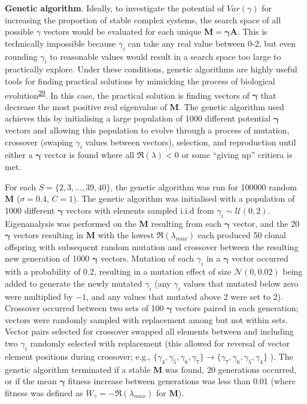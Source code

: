 \documentclass[]{article}
\begin{document}
\textbf{Genetic algorithm}. Ideally, to investigate the potential of
\(Var(\gamma)\) for increasing the proportion of stable complex systems,
the search space of all possible \(\gamma\) vectors would be evaluated
for each unique \(\mathbf{M = \gamma A}\). This is technically
impossible because \(\gamma_{i}\) can take any real value between 0-2,
but even rounding \(\gamma_{i}\) to reasonable values would result in a
search space too large to practically explore. Under these conditions,
genetic algorithms are highly useful tools for finding practical
solutions by mimicking the process of biological
evolution\textsuperscript{\protect\hyperlink{ref-Hamblin2013}{29}}. In
this case, the practical solution is finding vectors of
\(\mathbf{\gamma}\) that decrease the most positive real eigenvalue of
\(\mathbf{M}\). The genetic algorithm used achieves this by initialising
a large population of 1000 different potential \(\mathbf{\gamma}\)
vectors and allowing this population to evolve through a process of
mutation, crossover (swaping \(\gamma_{i}\) values between vectors),
selection, and reproduction until either a \(\mathbf{\gamma}\) vector is
found where all \(\Re(\lambda) < 0\) or some ``giving up'' critiera is
met.

For each \(S = \{2, 3, ..., 39, 40\}\), the genetic algorithm was run
for 100000 random \(\mathbf{M}\) (\(\sigma = 0.4\), \(C = 1\)). The
genetic algorithm was initialised with a population of 1000 different
\(\mathbf{\gamma}\) vectors with elements sampled i.i.d from
\(\gamma_{i} \sim \mathcal{U}(0, 2)\). Eigenanalysis was performed on
the \(\mathbf{M}\) resulting from each \(\mathbf{\gamma}\) vector, and
the 20 \(\mathbf{\gamma}\) vectors resulting in \(\mathbf{M}\) with the
lowest \(\Re(\lambda_{max})\) each produced 50 clonal offspring with
subsequent random mutation and crossover between the resulting new
generation of 1000 \(\mathbf{\gamma}\) vectors. Mutation of each
\(\gamma_{i}\) in a \(\mathbf{\gamma}\) vector occurred with a
probability of 0.2, resulting in a mutation effect of size
\(\mathcal{N}(0, 0.02)\) being added to generate the newly mutated
\(\gamma_{i}\) (any \(\gamma_{i}\) values that mutated below zero were
multiplied by \(-1\), and any values that mutated above 2 were set to
2). Crossover occurred between two sets of 100 \(\mathbf{\gamma}\)
vectors paired in each generation; vectors were randomly sampled with
replacement among but not within sets. Vector pairs selected for
crossover swapped all elements between and including two \(\gamma_{i}\)
randomly selected with replacement (this allowed for reversal of vector
element positions during crossover; e.g.,
\(\{\gamma_{4}, \gamma_{5}, \gamma_{6}, \gamma_{7}\} \to \{\gamma_{7}, \gamma_{6}, \gamma_{5}, \gamma_{4}\}\)
). The genetic algorithm terminated if a stable \(\mathbf{M}\) was
found, 20 generations occurred, or if the mean \(\mathbf{\gamma}\)
fitness increase between generations was less than 0.01 (where fitness
was defined as \(W_{\gamma} = -\Re(\lambda_{max})\) for \(\mathbf{M}\)).
\end{document}
